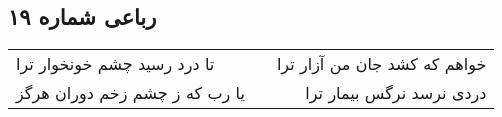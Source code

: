 \begin{center}
\section*{رباعی شماره ۱۹}
\label{sec:sh019}
\begin{longtable}{l p{0.5cm} r}
تا درد رسید چشم خونخوار ترا
&&
خواهم که کشد جان من آزار ترا
\\
یا رب که ز چشم زخم دوران هرگز
&&
دردی نرسد نرگس بیمار ترا
\\
\end{longtable}
\end{center}
